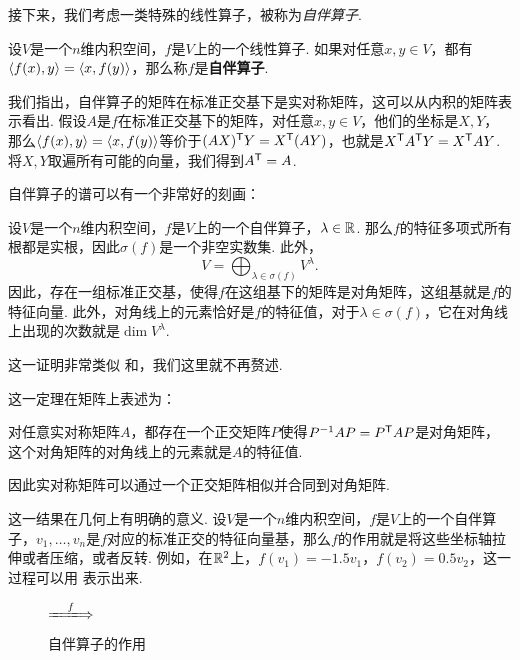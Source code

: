 接下来，我们考虑一类特殊的线性算子，被称为\emph{自伴算子}.

\begin{definition}[自伴算子]
设$V$是一个$n$维内积空间，$f$是$V$上的一个线性算子. 如果对任意$x,y\in V$，都有$\left\langle{f(x)},{y}\right\rangle=\left\langle{x},{f(y)}\right\rangle$，那么称$f$是\textbf{自伴算子}. 
\end{definition}
我们指出，自伴算子的矩阵在标准正交基下是实对称矩阵，这可以从内积的矩阵表示看出. 假设$A$是$f$在标准正交基下的矩阵，对任意$x,y\in V$，他们的坐标是$X,Y$，那么$\left\langle{f(x)},{y}\right\rangle=\left\langle{x},{f(y)}\right\rangle$等价于$(AX)^{\mathsf{T}} Y=X^{\mathsf{T}}(AY)$，也就是$X^{\mathsf{T}} A^{\mathsf{T}} Y=X^{\mathsf{T}} AY$. 将$X,Y$取遍所有可能的向量，我们得到$A^{\mathsf{T}}=A$.

自伴算子的谱可以有一个非常好的刻画：
\begin{theorem}\label{thm:symmetric-operator-spectrum}
    设$V$是一个$n$维内积空间，$f$是$V$上的一个自伴算子，$\lambda\in\mathbb{R}$. 那么$f$的特征多项式所有根都是实根，因此$\sigma(f)$是一个非空实数集. 此外，
    \[V=\bigoplus_{\lambda\in\sigma(f)}V^\lambda.\]
    因此，存在一组标准正交基，使得$f$在这组基下的矩阵是对角矩阵，这组基就是$f$的特征向量. 此外，对角线上的元素恰好是$f$的特征值，对于$\lambda\in\sigma(f)$，它在对角线上出现的次数就是$\dim V^\lambda$. 
\end{theorem}
这一证明非常类似 和，我们这里就不再赘述. 

这一定理在矩阵上表述为：
\begin{corollary}\label{cor:symmetric-matrix-spectrum}
对任意实对称矩阵$A$，都存在一个正交矩阵$P$使得$P^{-1}AP=P^{\mathsf{T}} AP$是对角矩阵，这个对角矩阵的对角线上的元素就是$A$的特征值. 
\end{corollary}
因此实对称矩阵可以通过一个正交矩阵相似并合同到对角矩阵. 

这一结果在几何上有明确的意义. 设$V$是一个$n$维内积空间，$f$是$V$上的一个自伴算子，$v_1,\dots,v_n$是$f$对应的标准正交的特征向量基，那么$f$的作用就是将这些坐标轴拉伸或者压缩，或者反转. 例如，在$\mathbb{R}^2$上，$f(v_1)=-1.5v_1$，$f(v_2)=0.5v_2$，这一过程可以用 表示出来. 

\begin{figure}[ht]
\centering
\begin{minipage}[c]{0.3\linewidth}
\end{minipage}
$\xLongrightarrow{\quad f\quad}$
\begin{minipage}[c]{0.3\linewidth}
\end{minipage}
\caption{自伴算子的作用}
\label{fig:symmetric-operator}
\end{figure}

